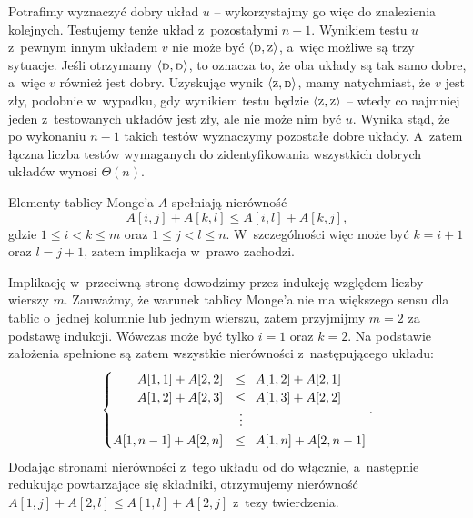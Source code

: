 Potrafimy wyznaczyć dobry układ $u$ -- wykorzystajmy go więc do znalezienia kolejnych.
Testujemy tenże układ z~pozostałymi $n-1$.
Wynikiem testu $u$ z~pewnym innym układem $v$ nie może być $\langle{\scriptstyle\rm D},{\scriptstyle\rm Z}\rangle$, a~więc możliwe są trzy sytuacje.
Jeśli otrzymamy $\langle{\scriptstyle\rm D},{\scriptstyle\rm D}\rangle$, to oznacza to, że oba układy są tak samo dobre, a~więc $v$ również jest dobry.
Uzyskując wynik $\langle{\scriptstyle\rm Z},{\scriptstyle\rm D}\rangle$, mamy natychmiast, że $v$ jest zły, podobnie w~wypadku, gdy wynikiem testu będzie $\langle{\scriptstyle\rm Z},{\scriptstyle\rm Z}\rangle$ -- wtedy co najmniej jeden z~testowanych układów jest zły, ale nie może nim być $u$.
Wynika stąd, że po wykonaniu $n-1$ takich testów wyznaczymy pozostałe dobre układy.
A~zatem łączna liczba testów wymaganych do zidentyfikowania wszystkich dobrych układów wynosi $\Theta(n)$.


\subproblem %
Elementy tablicy Monge'a $A$ spełniają nierówność
\[
	A[i,j]+A[k,l] \le A[i,l]+A[k,j],
\]
gdzie $1\le i<k\le m$ oraz $1\le j<l\le n$.
W~szczególności więc może być $k=i+1$ oraz $l=j+1$, zatem implikacja w~prawo zachodzi.

Implikację w~przeciwną stronę dowodzimy przez indukcję względem liczby wierszy $m$.
Zauważmy, że warunek tablicy Monge'a nie ma większego sensu dla tablic o~jednej kolumnie lub jednym wierszu, zatem przyjmijmy $m=2$ za podstawę indukcji.
Wówczas może być tylko $i=1$ oraz $k=2$.
Na podstawie założenia spełnione są zatem wszystkie nierówności z~następującego układu:
\[
	\begin{cases}
		\hfill A[1,1]+A[2,2] &\le\,\,\, A[1,2]+A[2,1] \\
		\hfill A[1,2]+A[2,3] &\le\,\,\, A[1,3]+A[2,2] \\
		& \;\vdots \\
		A[1,n-1]+A[2,n] &\le\,\,\, A[1,n]+A[2,n-1] \\
	\end{cases}.
\]
Dodając stronami nierówności z~tego układu od  do  włącznie, a~następnie redukując powtarzające się składniki, otrzymujemy nierówność $A[1,j]+A[2,l]\le A[1,l]+A[2,j]$ z~tezy twierdzenia.

